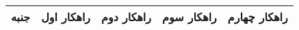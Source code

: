 \begin{table}[H]
\centering
\begin{tabular}{|c|c|c|c|c|}
\hline
\textbf{جنبه} & \textbf{راهکار اول} & \textbf{راهکار دوم} & \textbf{راهکار سوم} & \textbf{راهکار چهارم} \\
\hline
\end{tabular}
\end{table}
